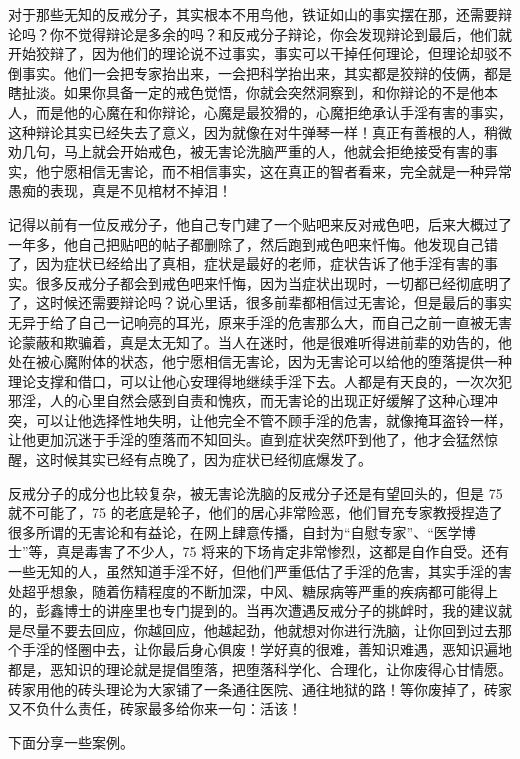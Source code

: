 对于那些无知的反戒分子，其实根本不用鸟他，铁证如山的事实摆在那，还需要辩论吗？你不觉得辩论是多余的吗？和反戒分子辩论，你会发现辩论到最后，他们就开始狡辩了，因为他们的理论说不过事实，事实可以干掉任何理论，但理论却驳不倒事实。他们一会把专家抬出来，一会把科学抬出来，其实都是狡辩的伎俩，都是瞎扯淡。如果你具备一定的戒色觉悟，你就会突然洞察到，和你辩论的不是他本人，而是他的心魔在和你辩论，心魔是最狡猾的，心魔拒绝承认手淫有害的事实，这种辩论其实已经失去了意义，因为就像在对牛弹琴一样！真正有善根的人，稍微劝几句，马上就会开始戒色，被无害论洗脑严重的人，他就会拒绝接受有害的事实，他宁愿相信无害论，而不相信事实，这在真正的智者看来，完全就是一种异常愚痴的表现，真是不见棺材不掉泪！

记得以前有一位反戒分子，他自己专门建了一个贴吧来反对戒色吧，后来大概过了一年多，他自己把贴吧的帖子都删除了，然后跑到戒色吧来忏悔。他发现自己错了，因为症状已经给出了真相，症状是最好的老师，症状告诉了他手淫有害的事实。很多反戒分子都会到戒色吧来忏悔，因为当症状出现时，一切都已经彻底明了了，这时候还需要辩论吗？说心里话，很多前辈都相信过无害论，但是最后的事实无异于给了自己一记响亮的耳光，原来手淫的危害那么大，而自己之前一直被无害论蒙蔽和欺骗着，真是太无知了。当人在迷时，他是很难听得进前辈的劝告的，他处在被心魔附体的状态，他宁愿相信无害论，因为无害论可以给他的堕落提供一种理论支撑和借口，可以让他心安理得地继续手淫下去。人都是有天良的，一次次犯邪淫，人的心里自然会感到自责和愧疚，而无害论的出现正好缓解了这种心理冲突，可以让他选择性地失明，让他完全不管不顾手淫的危害，就像掩耳盗铃一样，让他更加沉迷于手淫的堕落而不知回头。直到症状突然吓到他了，他才会猛然惊醒，这时候其实已经有点晚了，因为症状已经彻底爆发了。

反戒分子的成分也比较复杂，被无害论洗脑的反戒分子还是有望回头的，但是 75 就不可能了，75 的老底是轮子，他们的居心非常险恶，他们冒充专家教授捏造了很多所谓的无害论和有益论，在网上肆意传播，自封为“自慰专家”、“医学博士”等，真是毒害了不少人，75 将来的下场肯定非常惨烈，这都是自作自受。还有一些无知的人，虽然知道手淫不好，但他们严重低估了手淫的危害，其实手淫的害处超乎想象，随着伤精程度的不断加深，中风、糖尿病等严重的疾病都可能得上的，彭鑫博士的讲座里也专门提到的。当再次遭遇反戒分子的挑衅时，我的建议就是尽量不要去回应，你越回应，他越起劲，他就想对你进行洗脑，让你回到过去那个手淫的怪圈中去，让你最后身心俱废！学好真的很难，善知识难遇，恶知识遍地都是，恶知识的理论就是提倡堕落，把堕落科学化、合理化，让你废得心甘情愿。砖家用他的砖头理论为大家铺了一条通往医院、通往地狱的路！等你废掉了，砖家又不负什么责任，砖家最多给你来一句：活该！

下面分享一些案例。

